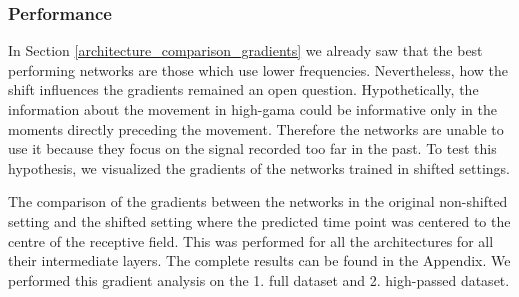 \subsubsection{Performance}
In Section \ref{architecture_comparison_gradients} we already saw that the best performing networks are those which use lower frequencies.
Nevertheless, how the shift influences the gradients remained an open question.
Hypothetically, the information about the movement in high-gama could be informative only in the moments directly preceding the movement.
Therefore the networks are unable to use it because they focus on the signal recorded too far in the past.
To test this hypothesis, we visualized the gradients of the networks trained in shifted settings.

The comparison of the gradients between the networks in the original non-shifted setting and the shifted setting where the predicted time point was centered to the centre of the receptive field.
This was performed for all the architectures for all their intermediate layers.
The complete results can be found in the Appendix.
We performed this gradient analysis on the 1. full dataset and 2. high-passed dataset.


